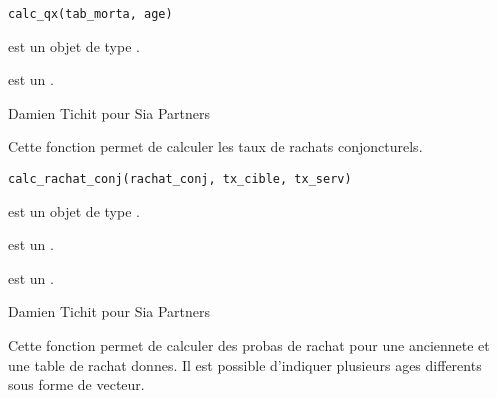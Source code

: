 \documentclass[a4paper]{book}
\begin{document}
%
\begin{Usage}
\begin{verbatim}
calc_qx(tab_morta, age)
\end{verbatim}
\end{Usage}
%
\begin{Arguments}
\begin{ldescription}
\item[\code{tab\_morta}] est un objet de type .

\item[\code{age}] est un .
\end{ldescription}
\end{Arguments}
%
\begin{Author}\relax
Damien Tichit pour Sia Partners
\end{Author}
%
\begin{Description}\relax
Cette fonction permet de calculer les taux de rachats conjoncturels.
\end{Description}
%
\begin{Usage}
\begin{verbatim}
calc_rachat_conj(rachat_conj, tx_cible, tx_serv)
\end{verbatim}
\end{Usage}
%
\begin{Arguments}
\begin{ldescription}
\item[\code{rachat\_conj}] est un objet de type .

\item[\code{tx\_cible}] est un .

\item[\code{tx\_serv}] est un .
\end{ldescription}
\end{Arguments}
%
\begin{Author}\relax
Damien Tichit pour Sia Partners
\end{Author}
%
\begin{Description}\relax
Cette fonction permet de calculer des probas de rachat pour une anciennete et une table de rachat donnes.
Il est possible d'indiquer plusieurs ages differents sous forme de vecteur.
\end{Description}
\end{document}
